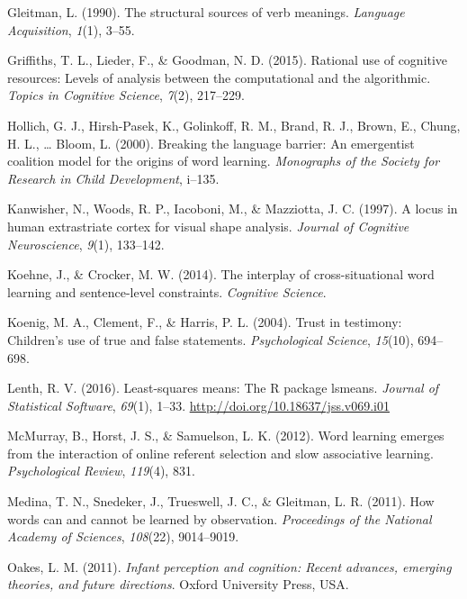 \documentclass[authoryear, review]{elsarticle}
\begin{document}
\hypertarget{ref-gleitman1990structural}{}
Gleitman, L. (1990). The structural sources of verb meanings.
\emph{Language Acquisition}, \emph{1}(1), 3--55.

\hypertarget{ref-griffiths2015rational}{}
Griffiths, T. L., Lieder, F., \& Goodman, N. D. (2015). Rational use of
cognitive resources: Levels of analysis between the computational and
the algorithmic. \emph{Topics in Cognitive Science}, \emph{7}(2),
217--229.

\hypertarget{ref-hollich2000breaking}{}
Hollich, G. J., Hirsh-Pasek, K., Golinkoff, R. M., Brand, R. J., Brown,
E., Chung, H. L., \ldots{} Bloom, L. (2000). Breaking the language
barrier: An emergentist coalition model for the origins of word
learning. \emph{Monographs of the Society for Research in Child
Development}, i--135.

\hypertarget{ref-kanwisher1997locus}{}
Kanwisher, N., Woods, R. P., Iacoboni, M., \& Mazziotta, J. C. (1997). A
locus in human extrastriate cortex for visual shape analysis.
\emph{Journal of Cognitive Neuroscience}, \emph{9}(1), 133--142.

\hypertarget{ref-koehne2014interplay}{}
Koehne, J., \& Crocker, M. W. (2014). The interplay of cross-situational
word learning and sentence-level constraints. \emph{Cognitive Science}.

\hypertarget{ref-koenig2004trust}{}
Koenig, M. A., Clement, F., \& Harris, P. L. (2004). Trust in testimony:
Children's use of true and false statements. \emph{Psychological
Science}, \emph{15}(10), 694--698.

\hypertarget{ref-lenth2016lsmeans}{}
Lenth, R. V. (2016). Least-squares means: The R package lsmeans.
\emph{Journal of Statistical Software}, \emph{69}(1), 1--33.
\url{http://doi.org/10.18637/jss.v069.i01}

\hypertarget{ref-mcmurray2012word}{}
McMurray, B., Horst, J. S., \& Samuelson, L. K. (2012). Word learning
emerges from the interaction of online referent selection and slow
associative learning. \emph{Psychological Review}, \emph{119}(4), 831.

\hypertarget{ref-medina2011words}{}
Medina, T. N., Snedeker, J., Trueswell, J. C., \& Gleitman, L. R.
(2011). How words can and cannot be learned by observation.
\emph{Proceedings of the National Academy of Sciences}, \emph{108}(22),
9014--9019.

\hypertarget{ref-oakes2011infant}{}
Oakes, L. M. (2011). \emph{Infant perception and cognition: Recent
advances, emerging theories, and future directions}. Oxford University
Press, USA.
\end{document}
